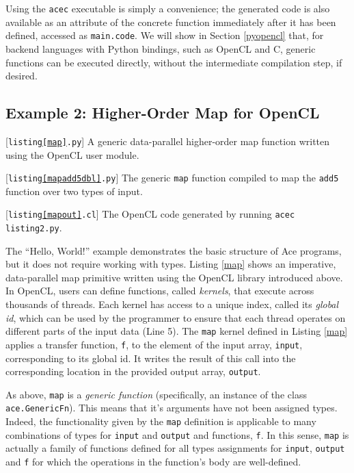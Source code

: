 \documentclass{sig-alternate}
\begin{document}
Using the \verb|acec| executable is simply a convenience; the generated code is also available as an attribute of the concrete function immediately after it has been defined, accessed as \verb|main.code|. We will show in Section \ref{pyopencl} that, for backend languages with Python bindings, such as OpenCL and C, generic functions can be executed directly, without the intermediate compilation step, if desired.

\subsection{Example 2: Higher-Order Map for OpenCL}
\begin{codelisting}

\caption{[\texttt{listing\ref{map}.py}] A generic data-parallel higher-order map function written using the OpenCL user module.}
\label{map}
\end{codelisting}

\begin{codelisting}

\caption{[\texttt{listing\ref{mapadd5dbl}.py}] The generic \texttt{map} function compiled to map the \texttt{add5} function over two  types of input.}
\label{mapadd5dbl}
\end{codelisting}

\begin{codelisting}

\caption{[\texttt{listing\ref{mapout}.cl}] The OpenCL code generated by running \texttt{acec listing2.py}.}
\label{mapout}
\end{codelisting}

The ``Hello, World!'' example demonstrates the basic structure of Ace programs, but it does not require working with types. Listing \ref{map} shows an imperative, data-parallel map primitive written using the OpenCL library introduced above. In OpenCL, users can define functions, called {\em kernels}, that execute across thousands of threads. Each kernel has access to a unique index, called its {\em global id}, which can be used by the programmer to ensure that each thread operates on different parts of the input data (Line 5). The \verb|map| kernel defined in Listing \ref{map} applies a transfer function, \verb|f|, to the element of the input array, \verb|input|, corresponding to its global id. It writes the result of this call into the corresponding location in the provided output array, \verb|output|.

As above, \verb|map| is a {\em generic function} (specifically, an instance of the class \verb|ace.GenericFn|). This means that it's arguments have not been assigned types. Indeed, the functionality given by the \verb|map| definition is applicable to many combinations of types for \verb|input| and \verb|output| and functions, \verb|f|. In this sense, \verb|map| is actually a family of functions defined for all types assignments for \verb|input|, \verb|output| and \verb|f| for which the operations in the function's body are well-defined.
\end{document}
